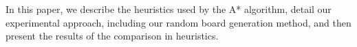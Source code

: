 In this paper, we describe the heuristics used by the A* algorithm, detail our experimental approach, including our random board generation method, and then present the results of the comparison in heuristics.



